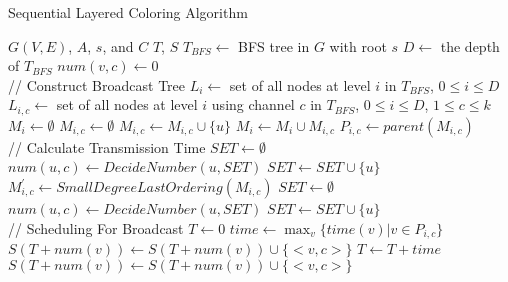 \documentclass[10pt, conference]{IEEEtran}
\begin{document}
\begin{algorithm}[htb]
\caption{Sequential Layered Coloring Algorithm}
\label{A2}
\begin{algorithmic}[1]
\REQUIRE $G(V, E)$, $A$, $s$, and $C$
\ENSURE $T$, $S$
\STATE $T_{BFS} \leftarrow $ BFS tree in $G$ with root $s$
\STATE $D \leftarrow$ the depth of $T_{BFS}$
        \STATE $num(v, c) \leftarrow 0$
    \ENDFOR
\ENDFOR\\
// Construct Broadcast Tree
    \STATE $L_{i} \leftarrow$ set of all nodes at level $i$ in
$T_{BFS}$, $0 \leq i \leq D$
    \STATE $L_{i,c} \leftarrow$ set of all nodes at level $i$ using channel $c$ in
$T_{BFS}$, $0 \leq i \leq D$, $1 \leq c \leq k$
    \STATE $M_i \leftarrow \emptyset$
            \STATE $M_{i,c} \leftarrow \emptyset$
                \STATE $M_{i,c} \leftarrow M_{i,c} \cup \{u\}$
            \ENDIF
        \ENDFOR
        \STATE $M_i \leftarrow M_i \cup M_{i,c}$
        \STATE $P_{i, c} \leftarrow parent(M_{i, c})$
    \ENDFOR
\ENDFOR\\
// Calculate Transmission Time
        \STATE $SET \leftarrow \emptyset$
            \STATE $num(u, c) \leftarrow DecideNumber(u, SET)$
            \STATE $SET \leftarrow SET \cup \{u\}$
        \ENDFOR
        \STATE $M^{'}_{i,c} \leftarrow SmallDegreeLastOrdering(M_{i, c})$
        \STATE $SET \leftarrow \emptyset$
            \STATE $num(u, c) \leftarrow DecideNumber(u, SET)$
            \STATE $SET \leftarrow SET \cup \{u\}$
        \ENDFOR
    \ENDFOR
\ENDFOR\\
// Scheduling For Broadcast
\STATE $T \leftarrow 0$
        \STATE $time \leftarrow \max_v\{time(v) | v \in P_{i,c}\}$
            \STATE $S(T+num(v)) \leftarrow S(T+num(v)) \cup \{<v, c>\} $
        \ENDFOR
        \STATE $T \leftarrow T + time$
    \ENDFOR
            \STATE $S(T+num(v)) \leftarrow S(T+num(v)) \cup \{<v, c>\} $
        \ENDFOR
    \ENDFOR
\ENDFOR
\end{algorithmic}
\end{algorithm}
\end{document}
